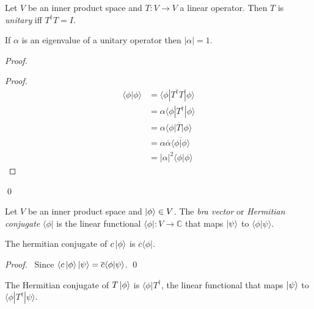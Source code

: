 \begin{df}[Unitary]
Let $V$ be an inner product space and $T : V \rightarrow V$ a linear operator. Then $T$ is \emph{unitary} iff $T^\dagger T = I$.
\end{df}

\begin{prop}
If $\alpha$ is an eigenvalue of a unitary operator then $|\alpha| = 1$.
\end{prop}

\begin{proof}
\pf
{}
\begin{proof}
	\pf
	\begin{align*}
		\langle \phi | \phi \rangle
		& = \langle \phi | T^\dagger T | \phi \rangle \\
		& = \alpha \langle \phi | T^\dagger | \phi \rangle \\
		& = \alpha \overline{\langle \phi | T | \phi \rangle} \\
		& = \alpha \overline{\alpha} \overline{\langle \phi | \phi \rangle} \\
		& = |\alpha|^2 \langle \phi | \phi \rangle
	\end{align*}
\end{proof}
\qed
\end{proof}

\begin{df}
Let $V$ be an inner product space and $\left| {\phi} \right\rangle \in V$. The \emph{bra vector} or \emph{Hermitian conjugate} $\langle \phi |$ is the linear functional $\langle \phi | : V \rightarrow \mathbb{C}$ that maps $\left| {\psi} \right\rangle$ to $\langle \phi | \psi \rangle$.
\end{df}

\begin{prop}
The hermitian conjugate of $c \left| {\phi} \right\rangle$ is $\overline{c} \langle \phi |$.
\end{prop}

\begin{proof}
\pf\ Since $\langle c \left| {\phi} \right\rangle | \psi \rangle = \overline{c} \langle \phi | \psi \rangle$. \qed
\end{proof}

\begin{prop}
The Hermitian conjugate of $T \left| {\phi} \right\rangle$ is $\langle \phi | T^\dagger$, the linear functional that maps $\left| {\psi} \right\rangle$ to $\langle \phi | T^\dagger | \psi \rangle$.
\end{prop}

